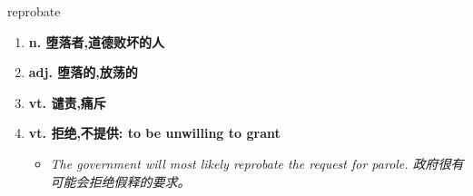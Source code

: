 
\begin{frame}
{\huge reprobate}
\begin{center}
\begin{enumerate}\Large
  \item \textbf{n. 堕落者,道德败坏的人}
  \item \textbf{adj. 堕落的,放荡的}
  \item \textbf{vt. 谴责,痛斥}
  \item \textbf{vt. 拒绝,不提供: to be unwilling to grant}
  \begin{itemize}
    \item \em{\Large{The government will most likely reprobate the request for parole. 政府很有可能会拒绝假释的要求。}}
  \end{itemize}
\end{enumerate}
\end{center}
\end{frame}
